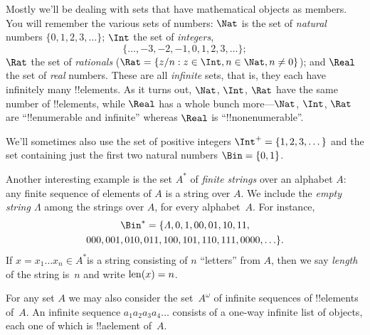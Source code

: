 \documentclass[../../../include/open-logic-section]{subfiles}
\begin{document}

\begin{ex}
Mostly we'll be dealing with sets that have mathematical objects as
members. You will remember the various sets of numbers: $\Nat$
is the set of \emph{natural} numbers $\{0, 1, \allowbreak 2, 3, \dots\}$;
$\Int$ the set of \emph{integers},
\[
\{\dots, -3, -2,
-1, 0, 1, 2, 3, \dots\};
\]
$\Rat$ the set of
\emph{rationals} ($\Rat = \Setabs{z/n}{z \in \Int, n \in \Nat, n \neq 0}$); and
$\Real$ the set of \emph{real} numbers. These are all \emph{infinite}
sets, that is, they each have infinitely many !!{element}s. As it turns
out, $\Nat$, $\Int$, $\Rat$ have the same number
of !!{element}s, while $\Real$ has a whole bunch more---$\Nat$,
$\Int$, $\Rat$ are ``!!{enumerable} and infinite'' whereas
$\Real$ is ``!!{nonenumerable}''.

We'll sometimes also use the set of positive integers $\Int^+ = \{1,
2, 3, \dots\}$ and the set containing just the first two natural
numbers $\Bin = \{0, 1\}$.
\end{ex}

\begin{ex}[Strings]
Another interesting example  is the set $A^{*}$ of
\emph{finite strings} over an alphabet $A$: any finite sequence of elements of
$A$ is a string over $A$. We include the \emph{empty string $\Lambda$}
among the strings over $A$, for every alphabet~$A$. For instance,
\begin{multline*}
\Bin^*
=\{\Lambda,0,1,00,01,10,11,\\
000,001,010,011,100,101,110,111,0000,\ldots\}.
\end{multline*}
If $x=x_{1}\ldots x_{n}\in A^{*}$is a string consisting of $n$
``letters'' from $A$, then we say \emph{length} of the string is~$n$
and write $\mathrm{len}(x)=n$.
\end{ex}

\begin{ex}
For any set $A$ we may also consider the set~$A^\omega$ of infinite
sequences of !!{element}s of~$A$. An infinite sequence
$a_1a_2a_3a_4\dots$ consists of a one-way infinite list of objects,
each one of which is !!a{element} of~$A$.
\end{ex}
\end{document}
